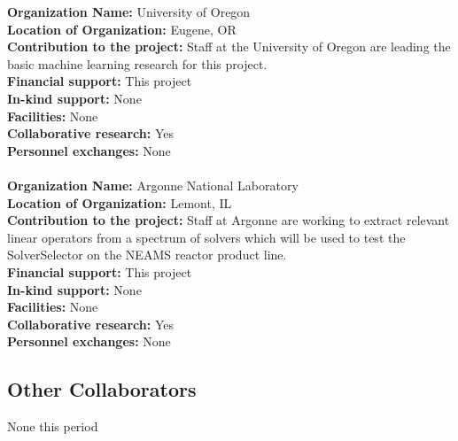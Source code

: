 {\bf Organization Name:} University of Oregon \\
{\bf Location of Organization:} Eugene, OR \\
{\bf Contribution to the project: } Staff at the University of Oregon are leading the basic machine learning research for this project.\\
{\bf Financial support:} This project\\ 
{\bf In-kind support:} None \\ 
{\bf Facilities: } None \\
{\bf Collaborative research: } Yes \\
{\bf Personnel exchanges:} None  \\\\
{\bf Organization Name:} Argonne National Laboratory\\
{\bf Location of Organization:} Lemont, IL\\
{\bf Contribution to the project: } Staff at Argonne are working to extract relevant linear operators from a spectrum of solvers which will be used to test the SolverSelector on the  NEAMS reactor product line. \\
{\bf Financial support:} This project \\ 
{\bf In-kind support:} None  \\
{\bf Facilities: } None\\
{\bf Collaborative research: } Yes \\
{\bf Personnel exchanges:} None \\ 

\subsection{Other Collaborators}
None this period

